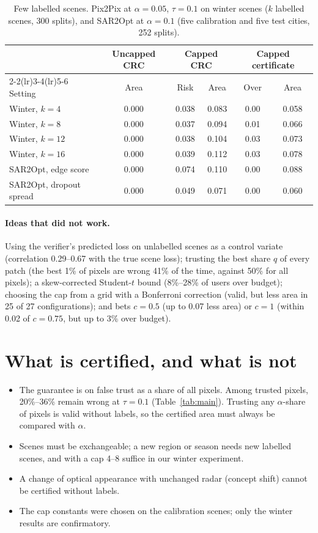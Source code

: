 \documentclass[11pt,a4paper]{article}
\theoremstyle{definition}
\theoremstyle{remark}
\newcommand{\1}{\mathbf{1}}
\begin{document}
\begin{table}[htbp]
\centering
\caption{Few labelled scenes. Pix2Pix at $\alpha=0.05$, $\tau=0.1$ on winter scenes ($k$ labelled scenes, 300 splits), and SAR2Opt at $\alpha=0.1$ (five calibration and five test cities, 252 splits).}
\label{tab:few}
\small
\begin{tabular}{@{}lccccc@{}}
\toprule
 & Uncapped CRC & \multicolumn{2}{c}{Capped CRC} & \multicolumn{2}{c}{Capped certificate}\\
\cmidrule(lr){2-2}\cmidrule(lr){3-4}\cmidrule(lr){5-6}
Setting & Area & Risk & Area & Over & Area\\
\midrule
Winter, $k=4$ & 0.000 & 0.038 & 0.083 & 0.00 & 0.058\\
Winter, $k=8$ & 0.000 & 0.037 & 0.094 & 0.01 & 0.066\\
Winter, $k=12$ & 0.000 & 0.038 & 0.104 & 0.03 & 0.073\\
Winter, $k=16$ & 0.000 & 0.039 & 0.112 & 0.03 & 0.078\\
\midrule
SAR2Opt, edge score & 0.000 & 0.074 & 0.110 & 0.00 & 0.088\\
SAR2Opt, dropout spread & 0.000 & 0.049 & 0.071 & 0.00 & 0.060\\
\bottomrule
\end{tabular}
\end{table}

\paragraph{Ideas that did not work.} Using the verifier's predicted loss on unlabelled scenes as a control variate (correlation 0.29--0.67 with the true scene loss); trusting the best share $q$ of every patch (the best 1\% of pixels are wrong 41\% of the time, against 50\% for all pixels); a skew-corrected Student-$t$ bound (8\%--28\% of users over budget); choosing the cap from a grid with a Bonferroni correction (valid, but less area in 25 of 27 configurations); and bets $c=0.5$ (up to 0.07 less area) or $c=1$ (within 0.02 of $c=0.75$, but up to 3\% over budget).

\section{What is certified, and what is not}\label{sec:limits}

\begin{itemize}[leftmargin=*]
\item The guarantee is on false trust as a share of all pixels. Among trusted pixels, 20\%--36\% remain wrong at $\tau=0.1$ (Table~\ref{tab:main}). Trusting any $\alpha$-share of pixels is valid without labels, so the certified area must always be compared with $\alpha$.
\item Scenes must be exchangeable; a new region or season needs new labelled scenes, and with a cap 4--8 suffice in our winter experiment.
\item A change of optical appearance with unchanged radar (concept shift) cannot be certified without labels.
\item The cap constants were chosen on the calibration scenes; only the winter results are confirmatory.
\end{itemize}
\end{document}
